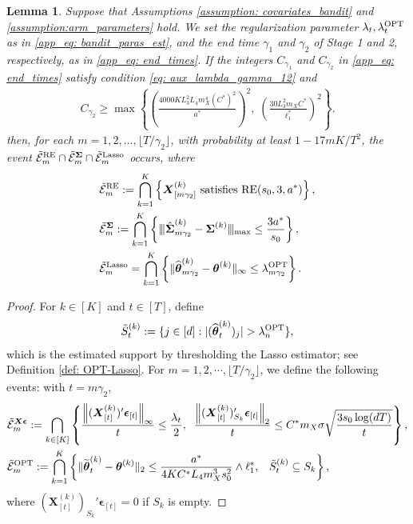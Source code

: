 \documentclass[aos,preprint]{imsart}
\theoremstyle{plain}
\newtheorem{lemma}[theorem]{Lemma}
\theoremstyle{definition}
\newcommand{\btheta}{\boldsymbol{\theta}}
\newcommand{\bd}[1]{\boldsymbol{#1}}
\newcommand{\hbtheta}{\widehat{\boldsymbol{\theta}}}
\newcommand{\bX}{\boldsymbol{X}}
\newcommand{\bSigma}{\boldsymbol{\Sigma}}
\newcommand{\mn}{\vert\kern-0.25ex \vert\kern-0.25ex \vert}
\newcommand{\tbtheta}{\widetilde{\boldsymbol{\theta}}}
\newcommand{\hdlambda}{\lambda^{\textup{OPT}}}
\newcommand{\tS}{\tilde{S}}
\newcommand{\mE}{\mathcal{E}}
\newcommand{\hbSigma}{\hat{\boldsymbol{\Sigma}}}
\newcommand{\bepsilon}{\bd{\epsilon}}
\begin{document}
\begin{appendix}
\begin{lemma}  \label{stage3: main lemma_second}
Suppose that Assumptions \ref{assumption: covariates_bandit} and \ref{assumption:arm_parameters} hold. We set the regularization parameter $\lambda_t,\hdlambda_t$ as in \eqref{app_eq: bandit_paras_est}, and the end time $\gamma_1$ and $\gamma_2$ of Stage 1 and 2, respectively, as in \eqref{app_eq: end_times}.
If the integers $C_{\gamma_1}$ and $C_{\gamma_2}$ in \eqref{app_eq: end_times} satisfy condition \eqref{eq: aux_lambda_gamma_12} and
\begin{align}
    \label{eq: aux_lambda_gamma_12_generalm}
     C_{\gamma_2} \geq \max\left\{\left(\frac{4000KL_3^2L_4 m_X^4(C^*)^2}{a^*}\right)^2, \; \left( \frac{30L_3^2 m_X C^*}{\ell_1^*}\right)^2 \right\}.
\end{align}
then, for each $m = 1,2,\ldots, \lfloor T/\gamma_2 \rfloor$,  with probability at least $1-17mK/T^2$, the event $\tilde{\mE}_m^{\textup{RE}} \cap \tilde{\mE}_m^{\bSigma} \cap  \tilde{\mE}_m^{\textup{Lasso}}$ occurs, where
\begin{align} \label{eq:aux_gamma2_events_generalm}
\begin{split}
&\tilde{\mE}_m^{\textup{RE}} := \bigcap_{k=1}^{K}\left\{\bX_{[m\gamma_2]}^{(k)} \textup{ satisfies } \textup{RE}(s_0, 3, a^*)\right\},\\ 
&\tilde{\mE}_m^{\bSigma} := \bigcap_{k=1}^{K}\left\{\mn\hbSigma_{m\gamma_2}^{(k)}-\bSigma^{(k)}\mn_{\textup{max}} \le  \frac{3 a^*}{s_0} \right\},\\ 
&\tilde{\mE}_m^{\textup{Lasso}} = \bigcap_{k = 1}^{K}\left\{\|\hbtheta_{m\gamma_2}^{(k)} - \btheta^{(k)}\|_{\infty} \leq  \hdlambda_{m\gamma_2}\right\}.
\end{split}
\end{align}
\end{lemma}

\begin{proof}
For $k \in [K]$ and $t \in [T]$, define
\begin{align*} 
    \tS_t^{(k)} := \{j \in [d]: |(\hbtheta_{t}^{(k)})_j| > \hdlambda_n\},
\end{align*}
which is the estimated support by thresholding the Lasso estimator; see Definition \ref{def: OPT-Lasso}. 
For $m=1,2,\cdots, \lfloor T/\gamma_2 \rfloor$, we define the following events: with $t = m\gamma_2$,
\begin{align}\label{def:stage3_more_events}
\begin{split}
       & \tilde{\mE}_m^{\bX\bepsilon} := \bigcap_{k\in [K]} \left\{\frac{\left\|({\bX_{[t]}^{(k)}})' \bepsilon_{[t]}\right\|_{\infty}}{t} \le \frac{\lambda_t}{2},\;\;
\frac{\left\|(\bX_{[t]}^{(k)})_{S_k}'\bepsilon_{[t]}\right\|_2 }{t}\le C^*m_X\sigma\sqrt{\frac{3s_0\log (dT)}{t}}\right\},  \\
   & \tilde{\mE}_m^{\textup{OPT}} := \bigcap_{k = 1}^{K}\left\{\|\tbtheta_t^{(k)}-\btheta^{(k)}\|_2 \le \frac{a^*}{4KC^*L_4 m_X^3 s_0^2} \wedge \ell_1^*, \;\;\; \tS_t^{(k)}\subseteq S_k \right\},
      \end{split} 
\end{align}
where $(\bX_{[t]}^{(k)})_{S_k}'\bepsilon_{[t]} = 0$ if $S_k$ is empty.


\end{proof}
\end{appendix}
\end{document}
